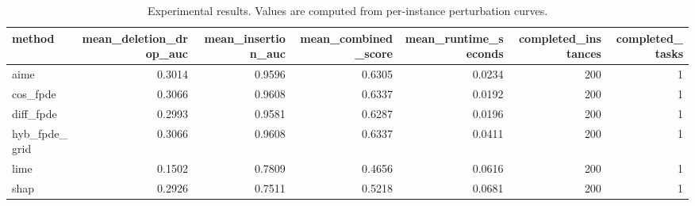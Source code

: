 \begin{table}[t]
\caption{Experimental results. Values are computed from per-instance perturbation curves.}
\label{tab:main_results_computed}
\centering
\begin{tabular}{lrrrrrr}
\toprule
method & mean\_deletion\_drop\_auc & mean\_insertion\_auc & mean\_combined\_score & mean\_runtime\_seconds & completed\_instances & completed\_tasks \\
\midrule
aime & 0.3014 & 0.9596 & 0.6305 & 0.0234 & 200 & 1 \\
cos\_fpde & 0.3066 & 0.9608 & 0.6337 & 0.0192 & 200 & 1 \\
diff\_fpde & 0.2993 & 0.9581 & 0.6287 & 0.0196 & 200 & 1 \\
hyb\_fpde\_grid & 0.3066 & 0.9608 & 0.6337 & 0.0411 & 200 & 1 \\
lime & 0.1502 & 0.7809 & 0.4656 & 0.0616 & 200 & 1 \\
shap & 0.2926 & 0.7511 & 0.5218 & 0.0681 & 200 & 1 \\
\bottomrule
\end{tabular}

\end{table}

